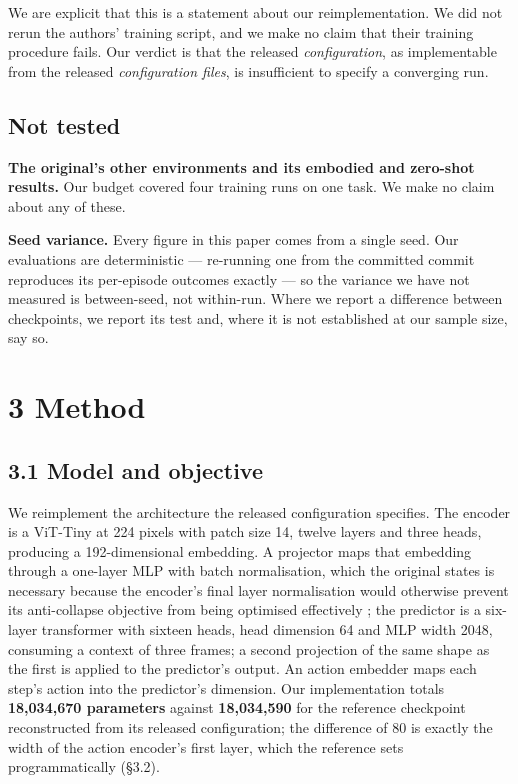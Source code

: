 \documentclass[10pt]{article}
\begin{document}
We are explicit that this is a statement about our reimplementation. We did not
rerun the authors' training script, and we make no claim that their training
procedure fails. Our verdict is that the released \emph{configuration}, as
implementable from the released \emph{configuration files}, is insufficient to
specify a converging run.

\subsection{Not tested}\label{not-tested}

\textbf{The original's other environments and its embodied and zero-shot results.}
Our budget covered four training runs on one task. We make no claim about any of
these.

\textbf{Seed variance.} Every figure in this paper comes from a single seed. Our
evaluations are deterministic --- re-running one from the committed commit
reproduces its per-episode outcomes exactly --- so the variance we have not
measured is between-seed, not within-run. Where we report a difference between
checkpoints, we report its test and, where it is not established at our sample
size, say so.

\section{3 Method}\label{method}

\subsection{3.1 Model and objective}\label{model-and-objective}

We reimplement the architecture the released configuration specifies. The
encoder is a ViT-Tiny at 224 pixels with patch size 14, twelve layers and three
heads, producing a 192-dimensional embedding. A projector maps that embedding
through a one-layer MLP with batch normalisation, which the original states is
necessary because the encoder's final layer normalisation would otherwise
prevent its anti-collapse objective from being optimised effectively
\citep[\S3.1]{maes2026lewm}; the predictor is a
six-layer transformer with sixteen heads, head dimension 64 and MLP width 2048,
consuming a context of three frames; a second projection of the same shape as
the first is applied to the predictor's output. An action embedder maps each
step's action into the predictor's dimension. Our implementation totals
\textbf{18,034,670 parameters} against \textbf{18,034,590} for the reference checkpoint
reconstructed from its released configuration; the difference of 80 is exactly
the width of the action encoder's first layer, which the reference sets
programmatically (\S{}3.2).
\end{document}
